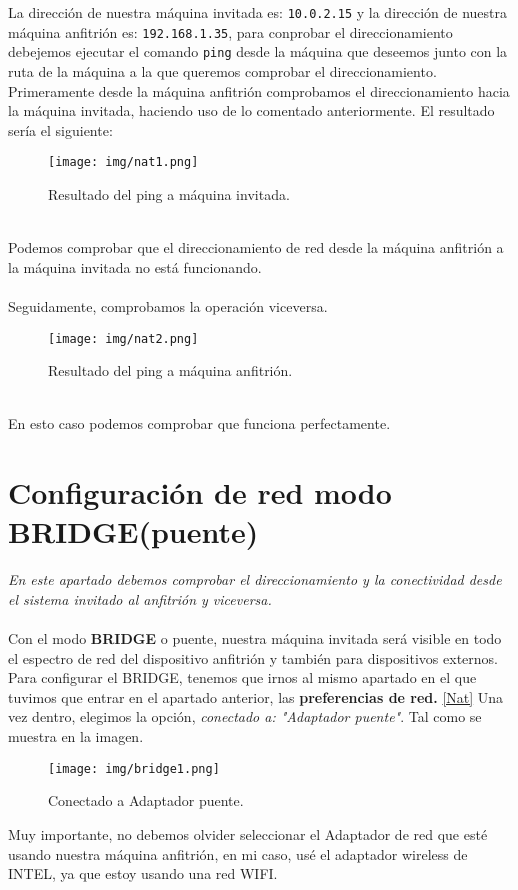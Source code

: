 \documentclass[12pt]{article}
\begin{document}
      La dirección de nuestra máquina invitada es: \texttt{10.0.2.15} y la dirección de nuestra máquina anfitrión es: \texttt{192.168.1.35}, 
      para conprobar el direccionamiento debejemos ejecutar el comando \texttt{ping} desde la máquina que deseemos junto con la ruta de la 
      máquina a la que queremos comprobar el direccionamiento.
      \\
      Primeramente desde la máquina anfitrión comprobamos el direccionamiento hacia la máquina invitada, haciendo uso de lo comentado anteriormente.
      El resultado sería el siguiente:
      \\
      \begin{figure}[h]
        \centering
        \texttt{[image: img/nat1.png]}
        \caption{Resultado del ping a máquina invitada.}
        \label{Nat3}
      \end{figure}
      \\
      Podemos comprobar que el direccionamiento de red desde la máquina anfitrión a la máquina invitada no está funcionando.
      \\\\
      Seguidamente, comprobamos la operación viceversa.
      \begin{figure}[h]
        \centering
        \texttt{[image: img/nat2.png]}
        \caption{Resultado del ping a máquina anfitrión.}
        \label{Nat4}
      \end{figure}
      \\
      En esto caso podemos comprobar que funciona perfectamente.

      \newpage

    \section{Configuración de red modo BRIDGE(puente)}
      \textit{En este apartado debemos comprobar el direccionamiento y la conectividad desde el sistema invitado al anfitrión y viceversa.}
      \\\\
      Con el modo \textbf{BRIDGE} o puente, nuestra máquina invitada será visible en todo el espectro de red del dispositivo anfitrión 
      y también para dispositivos externos.
      \\
      Para configurar el BRIDGE, tenemos que irnos al mismo apartado en el que tuvimos que entrar en el apartado anterior, las \textbf{
      preferencias de red.} \ref{Nat} Una vez dentro, elegimos la opción, \textit{conectado a: "Adaptador puente"}. Tal como se muestra 
      en la imagen.
      \begin{figure}[h]
        \centering
        \texttt{[image: img/bridge1.png]}
        \caption{Conectado a Adaptador puente.}
        \label{Bridge1}
      \end{figure}
      Muy importante, no debemos olvider seleccionar el Adaptador de red que esté usando nuestra máquina anfitrión, en mi caso, usé el 
      adaptador wireless de INTEL, ya que estoy usando una red WIFI.
\end{document}
